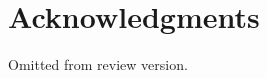 \documentclass{sigchi}
\begin{document}





\section{Acknowledgments}
Omitted from review version.


%
%
%
%
%
\balance



\end{document}
